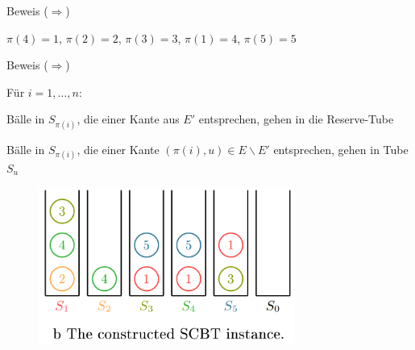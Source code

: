 \documentclass{beamer}
\begin{document}
\begin{frame}{Beweis (\glqq $\Rightarrow$\grqq)}
\begin{pointlist}
\item $\pi(4)=1$, $\pi(2)=2$, $\pi(3)=3$, $\pi(1)=4$, $\pi(5)=5$
\end{pointlist}
\begin{figure}
    \centering
\end{figure}
\end{frame}

\begin{frame}{Beweis (\glqq $\Rightarrow$\grqq)}
\begin{pointlist}
\item Für $i=1,\dots,n$:
\begin{arrowlist}
\item Bälle in $S_{\pi(i)}$, die einer Kante aus $E'$ entsprechen, gehen in die Reserve-Tube 
\item Bälle in $S_{\pi(i)}$, die einer Kante $(\pi(i),u)\in E\backslash E'$ entsprechen, gehen in Tube $S_u$
\end{arrowlist}
\end{pointlist}
\begin{figure}
    \centering
    \includegraphics[width=0.75\textwidth]{constgraph}
\end{figure}
\end{frame}
\end{document}
